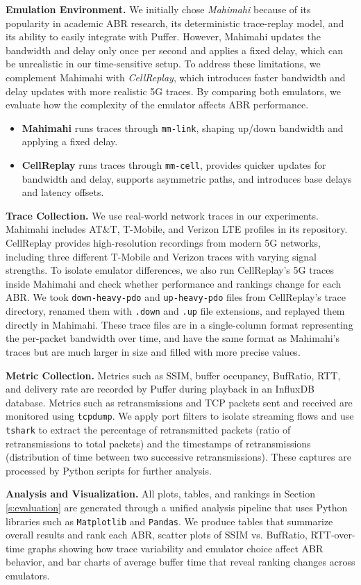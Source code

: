 \textbf{Emulation Environment.}  
We initially chose \emph{Mahimahi} because of its popularity in academic ABR research, its deterministic trace-replay model, and its ability to easily integrate with Puffer. However, Mahimahi updates the bandwidth and delay only once per second and applies a fixed delay, which can be unrealistic in our time-sensitive setup. To address these limitations, we complement Mahimahi with \emph{CellReplay}, which introduces faster bandwidth and delay updates with more realistic 5G traces. By comparing both emulators, we evaluate how the complexity of the emulator affects ABR performance.  
\begin{itemize}
    \item \textbf{Mahimahi} runs traces through \texttt{mm-link}, shaping up/down bandwidth and applying a fixed delay.  
    \item \textbf{CellReplay} runs traces through \texttt{mm-cell}, provides quicker updates for bandwidth and delay, supports asymmetric paths, and introduces base delays and latency offsets.
\end{itemize}

\textbf{Trace Collection.}  
We use real-world network traces in our experiments. Mahimahi includes AT\&T, T-Mobile, and Verizon LTE profiles in its repository. CellReplay provides high-resolution recordings from modern 5G networks, including three different T-Mobile and Verizon traces with varying signal strengths. To isolate emulator differences, we also run CellReplay’s 5G traces inside Mahimahi and check whether performance and rankings change for each ABR.   We took \texttt{down-heavy-pdo} and \texttt{up-heavy-pdo} files from CellReplay's trace directory, renamed them with \texttt{.down} and \texttt{.up} file extensions, and replayed them directly in Mahimahi. These trace files are in a single-column format representing the per-packet bandwidth over time, and have the same format as Mahimahi's traces but are much larger in size and filled with more precise values.

\textbf{Metric Collection.}  
Metrics such as SSIM, buffer occupancy, BufRatio, RTT, and delivery rate are recorded by Puffer during playback in an InfluxDB database. Metrics such as retransmissions and TCP packets sent and received are monitored using \texttt{tcpdump}. We apply port filters to isolate streaming flows and use \texttt{tshark} to extract the percentage of retransmitted packets (ratio of retransmissions to total packets) and the timestamps of retransmissions (distribution of time between two successive retransmissions). These captures are processed by Python scripts for further analysis.

\textbf{Analysis and Visualization.}  
All plots, tables, and rankings in Section \ref{s:evaluation} are generated through a unified analysis pipeline that uses Python libraries such as \texttt{Matplotlib} and \texttt{Pandas}. We produce tables that summarize overall results and rank each ABR, scatter plots of SSIM vs. BufRatio, RTT-over-time graphs showing how trace variability and emulator choice affect ABR behavior, and bar charts of average buffer time that reveal ranking changes across emulators.

